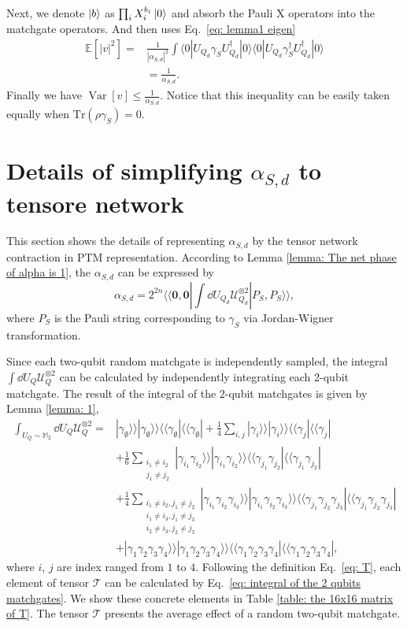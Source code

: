 \documentclass[showpacs,onecolumn,aps,prx,long bibliography,superscriptaddress,notitlepage]{revtex4-1}
\newcommand{\supket}[1]{|#1 \rangle\rangle}
\newcommand{\supbra}[1]{\langle\langle #1 |}
\newcommand{\supketbra}[2]{
    \supket{#1 } \supket{#1 } \supbra{#2} \supbra{#2} 
}
\newcommand{\tra}[1]{\text{Tr}\left( #1 \right)}
\newcommand{\Var}{\mathop{\mathrm{Var}}}
\newcommand{\Tcal}{\mathcal{T}}
\newcommand{\Mbb}{\mathbb{M}}
\begin{document}
Next, we denote $\ket{b}$ as $\prod_i X_i^{b_i}\ket{0}$ and absorb the Pauli X operators into the matchgate operators.                                          
And then uses Eq.~\eqref{eq: lemma1 eigen}
\begin{align}
    \mathbb{E}[|v|^2] =& \frac{1}{|\alpha_{S,d}|^2} \int \langle 0|U_{Q_d} \gamma_S U_{Q_d}^\dagger|0 \rangle \langle 0|U_{Q_d} \gamma_S^\dagger U_{Q_d}^\dagger|0 \rangle \\
 &=\frac{1}{\alpha_{S,d}}.
\end{align}
Finally we have $\Var[v] \leq \frac{1}{\alpha_{S,d}}$. 
Notice that this inequality can be easily taken equally when $\tra{\rho \gamma_S} = 0$.


\section{Details of simplifying $\alpha_{S,d}$ to tensore network}
\label{appendix 3}
 This section shows the details of representing $\alpha_{S,d}$ by the tensor network contraction in PTM representation. According to Lemma \ref{lemma: The net phase of alpha is 1}, the $\alpha_{S,d}$ can be expressed by 
 \begin{equation}
     \alpha_{S,d} = 2^{2n}  \supbra{\bm 0,\bm 0}  \int\dd U_{Q_d} \mathcal{U}_{Q_d}^{\otimes 2} \supket{P_S,P_S}, 
 \end{equation}
where $P_S$ is the Pauli string corresponding to $\gamma_S$ via Jordan-Wigner transformation. 

Since each two-qubit random matchgate is independently sampled, the integral $\int \dd U_Q \mathcal{U}_Q^{\otimes 2}$ can be calculated by independently integrating each 2-qubit matchgate. The result of the integral of the $2$-qubit matchgates is given by Lemma \ref{lemma: 1},
\begin{equation}
\label{eq: integral of the 2 qubits matchgates}
\begin{aligned}
    \int_{U_Q\sim \Mbb_2} \dd U_Q\mathcal{U}_Q^{\otimes 2} =& \supketbra{\gamma_\emptyset}{\gamma_\emptyset}
    + \frac{1}{4} \sum_{i,j} \supketbra{\gamma_i}{\gamma_j}\\
    &+ \frac{1}{6}\sum_{\substack{i_1\neq i_2 \\ j_1\neq j_2}}\supketbra{\gamma_{i_1}\gamma_{i_2}}{\gamma_{j_1}\gamma_{j_2}} \\
    &+ \frac{1}{4}
    \sum_{\substack{i_1\neq i_2, j_1 \neq j_2 \\ 
        i_1\neq i_3, j_1 \neq j_3 \\
        i_2\neq i_3, j_2 \neq j_3} 
    }
    \supketbra{\gamma_{i_1}\gamma_{i_2}\gamma_{i_3}}{\gamma_{j_1}\gamma_{j_2}\gamma_{j_3}}\\
    &+ \supketbra{\gamma_1\gamma_2\gamma_3\gamma_4}{\gamma_1\gamma_2\gamma_3\gamma_4},
\end{aligned}
\end{equation}
where $i$, $j$ are index ranged from $1$ to $4$. Following the definition Eq.~\eqref{eq: T}, each element of tensor $\Tcal$ can be calculated by Eq.~\eqref{eq: integral of the 2 qubits matchgates}.
We show these concrete elements in Table \ref{table: the 16x16 matrix of T}.  The tensor $\Tcal$ presents the average effect of a random two-qubit matchgate.
\end{document}
